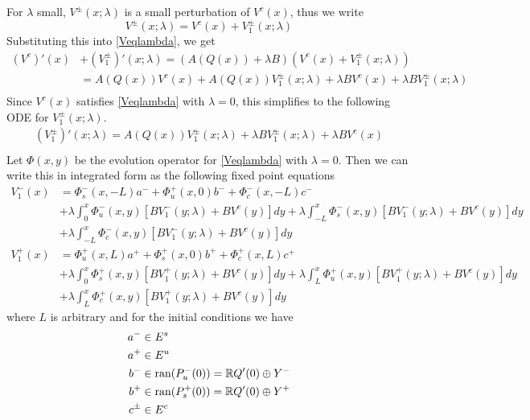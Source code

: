 \documentclass[thesis.tex]{subfiles}
\begin{document}
For $\lambda$ small, $V^\pm(x; \lambda)$ is a small perturbation of $V^c(x)$, thus we write 
\[
V^\pm(x; \lambda) = V^c(x) + V_1^\pm(x; \lambda)
\]
Substituting this into \eqref{Veqlambda}, we get
\begin{align*}
(V^c)'(x) &+ (V_1^\pm)'(x; \lambda)
= (A(Q(x)) + \lambda B)(V^c(x) + V_1^\pm(x; \lambda)) \\
&= A (Q(x))V^c(x) + A(Q(x))V_1^\pm(x; \lambda) + \lambda B V^c(x) + \lambda B V_1^\pm(x; \lambda) \\
\end{align*}
Since $V^c(x)$ satisfies \eqref{Veqlambda} with $\lambda = 0$, this simplifies to the following ODE for $V_1^\pm(x; \lambda)$.
\begin{align*}
(V_1^\pm)'(x; \lambda)
= A(Q(x))V_1^\pm(x; \lambda) + \lambda B V_1^\pm(x; \lambda) + \lambda B V^c(x) \\
\end{align*}
Let $\Phi(x,y)$ be the evolution operator for \eqref{Veqlambda} with $\lambda = 0$. Then we can write this in integrated form as the following fixed point equations
\begin{equation*}
\begin{aligned}
V_1^-(x) &= \Phi_s^-(x, -L) a^- + \Phi_u^+(x, 0) b^- + \Phi_c^-(x, -L) c^- \\
&+ \lambda \int_0^x \Phi_u^-(x, y) [B V_1^-(y; \lambda) + B V^c(y)] dy + \lambda \int_{-L}^x \Phi_s^-(x, y)[B V_1^-(y; \lambda) + B V^c(y)] dy \\
&+ \lambda \int_{-L}^x \Phi_c^-(x, y) [B V_1^-(y; \lambda) + B V^c(y)] dy \\ 
V_1^+(x) &= \Phi_u^+(x, L) a^+ + \Phi_s^+(x, 0) b^+ + \Phi_c^+(x, L)c^+ \\
&+ \lambda \int_0^x \Phi_s^+(x, y)[B V_1^+(y; \lambda) + B V^c(y)] dy
+ \lambda \int_{L}^x \Phi_u^+(x, y)[B V_1^+(y; \lambda) + B V^c(y)] dy \\
&+ \lambda \int_{L}^x \Phi_c^+(x, y)[B V_1^+(y; \lambda) + B V^c(y)] dy
\end{aligned}
\end{equation*}
where $L$ is arbitrary and for the initial conditions we have
\begin{align*}
a^- &\in E^s \\
a^+ &\in E^u \\
b^- &\in \text{ran}(P_u^-(0)) = {\mathbb R} Q'(0) \oplus Y^- \\
b^+ &\in \text{ran}(P_s^+(0)) = {\mathbb R} Q'(0) \oplus Y^+ \\
c^\pm &\in E^c \\
\end{align*}
\end{document}
